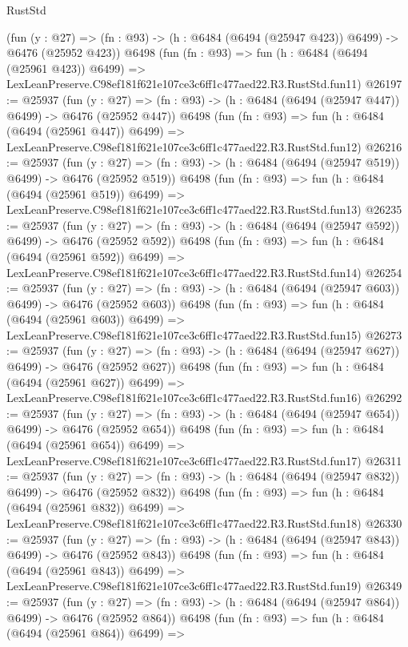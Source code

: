 \begin{lexlean}{RustStd}
\begin{coremodule}
    (fun (y : @27) => (fn : @93) -> (h : @6484 (@6494 (@25947 @423)) @6499) -> @6476 (@25952 @423))
    @6498
    (fun (fn : @93) =>
    fun (h : @6484 (@6494 (@25961 @423)) @6499) =>
    LexLeanPreserve.C98ef181f621e107ce3c6ff1c477aed22.R3.RustStd.fun11)
@26197 := @25937
    (fun (y : @27) => (fn : @93) -> (h : @6484 (@6494 (@25947 @447)) @6499) -> @6476 (@25952 @447))
    @6498
    (fun (fn : @93) =>
    fun (h : @6484 (@6494 (@25961 @447)) @6499) =>
    LexLeanPreserve.C98ef181f621e107ce3c6ff1c477aed22.R3.RustStd.fun12)
@26216 := @25937
    (fun (y : @27) => (fn : @93) -> (h : @6484 (@6494 (@25947 @519)) @6499) -> @6476 (@25952 @519))
    @6498
    (fun (fn : @93) =>
    fun (h : @6484 (@6494 (@25961 @519)) @6499) =>
    LexLeanPreserve.C98ef181f621e107ce3c6ff1c477aed22.R3.RustStd.fun13)
@26235 := @25937
    (fun (y : @27) => (fn : @93) -> (h : @6484 (@6494 (@25947 @592)) @6499) -> @6476 (@25952 @592))
    @6498
    (fun (fn : @93) =>
    fun (h : @6484 (@6494 (@25961 @592)) @6499) =>
    LexLeanPreserve.C98ef181f621e107ce3c6ff1c477aed22.R3.RustStd.fun14)
@26254 := @25937
    (fun (y : @27) => (fn : @93) -> (h : @6484 (@6494 (@25947 @603)) @6499) -> @6476 (@25952 @603))
    @6498
    (fun (fn : @93) =>
    fun (h : @6484 (@6494 (@25961 @603)) @6499) =>
    LexLeanPreserve.C98ef181f621e107ce3c6ff1c477aed22.R3.RustStd.fun15)
@26273 := @25937
    (fun (y : @27) => (fn : @93) -> (h : @6484 (@6494 (@25947 @627)) @6499) -> @6476 (@25952 @627))
    @6498
    (fun (fn : @93) =>
    fun (h : @6484 (@6494 (@25961 @627)) @6499) =>
    LexLeanPreserve.C98ef181f621e107ce3c6ff1c477aed22.R3.RustStd.fun16)
@26292 := @25937
    (fun (y : @27) => (fn : @93) -> (h : @6484 (@6494 (@25947 @654)) @6499) -> @6476 (@25952 @654))
    @6498
    (fun (fn : @93) =>
    fun (h : @6484 (@6494 (@25961 @654)) @6499) =>
    LexLeanPreserve.C98ef181f621e107ce3c6ff1c477aed22.R3.RustStd.fun17)
@26311 := @25937
    (fun (y : @27) => (fn : @93) -> (h : @6484 (@6494 (@25947 @832)) @6499) -> @6476 (@25952 @832))
    @6498
    (fun (fn : @93) =>
    fun (h : @6484 (@6494 (@25961 @832)) @6499) =>
    LexLeanPreserve.C98ef181f621e107ce3c6ff1c477aed22.R3.RustStd.fun18)
@26330 := @25937
    (fun (y : @27) => (fn : @93) -> (h : @6484 (@6494 (@25947 @843)) @6499) -> @6476 (@25952 @843))
    @6498
    (fun (fn : @93) =>
    fun (h : @6484 (@6494 (@25961 @843)) @6499) =>
    LexLeanPreserve.C98ef181f621e107ce3c6ff1c477aed22.R3.RustStd.fun19)
@26349 := @25937
    (fun (y : @27) => (fn : @93) -> (h : @6484 (@6494 (@25947 @864)) @6499) -> @6476 (@25952 @864))
    @6498
    (fun (fn : @93) =>
    fun (h : @6484 (@6494 (@25961 @864)) @6499) =>

\end{coremodule}
\end{lexlean}
